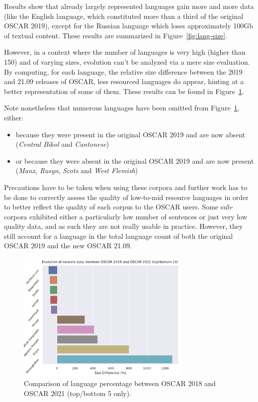 Results show that already largely represented languages gain more and more data (like the English language, which constituted more than a third of the original OSCAR 2019), except for the Russian language which loses approximately 100Gb of textual content. These results are summarized in Figure~\ref{fig:lang-size}.

However, in a context where the number of languages is very high (higher than 150) and of varying sizes, evolution can't be analyzed via a mere size evaluation. By computing, for each language, the relative size difference between the 2019 and 21.09 releases of OSCAR, less resourced languages do appear, hinting at a better representation of some of them. These results can be found in Figure~\ref{fig:lang-size-pctg}.

Note nonetheless that numerous languages have been omitted from Figure~\ref{fig:lang-size-pctg}, either:
\begin{itemize}
    \item because they were present in the original OSCAR 2019 and are now absent (\textit{Central Bikol} and \textit{Cantonese})
    \item or because they were absent in the original OSCAR 2019 and are now present (\textit{Manx}, \textit{Rusyn}, \textit{Scots} and \textit{West Flemish})
\end{itemize}

Precautions have to be taken when using these corpora and further work has to be done to correctly assess the quality of low-to-mid resource languages in order to better reflect the quality of each corpus to the OSCAR users. Some sub-corpora exhibited either a particularly low number of sentences or just very low quality data, and as such they are not really usable in practice. However, they still account for a language in the total language count of both the original OSCAR 2019 and the new OSCAR 21.09.

\begin{figure}[ht]
    \centering
    \includegraphics[width=0.75\textwidth, angle=0]{static/media/oscar/ungoliant/size_evo_pctg}
    \caption{Comparison of language percentage between OSCAR 2018 and OSCAR 2021 (top/bottom 5 only).}
    \label{fig:lang-size-pctg}
\end{figure}

